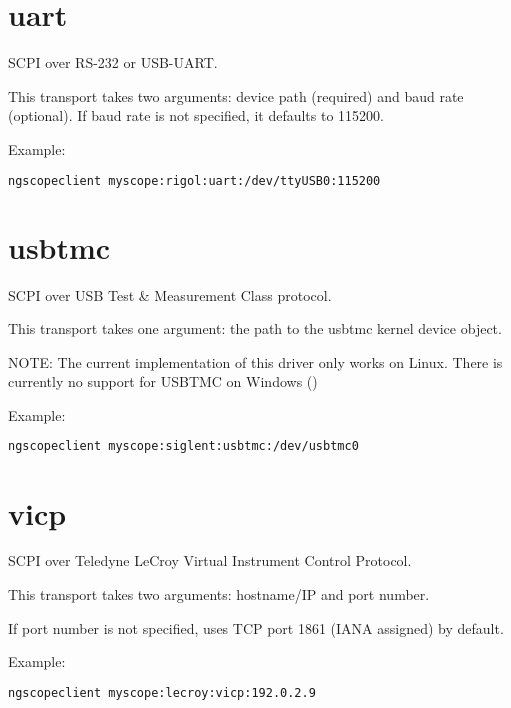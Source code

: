 \section{uart}

SCPI over RS-232 or USB-UART.

This transport takes two arguments: device path (required) and baud rate (optional). If baud rate is not specified, it
defaults to 115200.

Example:
\begin{lstlisting}[language=sh, numbers=none]
ngscopeclient myscope:rigol:uart:/dev/ttyUSB0:115200
\end{lstlisting}

\section{usbtmc}

SCPI over USB Test \& Measurement Class protocol.

This transport takes one argument: the path to the usbtmc kernel device object.

NOTE: The current implementation of this driver only works on Linux. There is currently no support for USBTMC on
Windows ()

Example:
\begin{lstlisting}[language=sh, numbers=none]
ngscopeclient myscope:siglent:usbtmc:/dev/usbtmc0
\end{lstlisting}

\section{vicp}

SCPI over Teledyne LeCroy Virtual Instrument Control Protocol.

This transport takes two arguments: hostname/IP and port number.

If port number is not specified, uses TCP port 1861 (IANA assigned) by default.

Example:
\begin{lstlisting}[language=sh, numbers=none]
ngscopeclient myscope:lecroy:vicp:192.0.2.9
\end{lstlisting}


